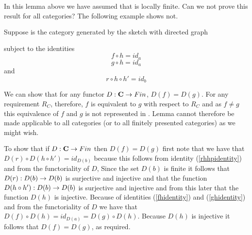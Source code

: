 In this lemma above we have assumed that \catcw is locally finite. Can we not prove this result for all categories? The following example shows not. 
\begin{example}
Suppose \catcw is the category generated by the sketch with directed graph

subject to the identities
\begin{equation}
\label{fhidentity}
f \circ h = id_a
\end{equation}
\begin{equation}
\label{ghidentity}
g \circ h = id_a
\end{equation}
and 
\begin{equation}
\label{rhhpidentity}
r \circ h \circ h' = id_b
\end{equation}

We can show that for any functor $D:\textbf{C} \rightarrow Fin$, $D(f)=D(g)$. For any requirement 
$R_C$, therefore, $f$ is equivalent to $g$ with respect to $R_C$ and as $f \neq g$ this equivalence of $f$ and $g$ 
is not represented in \catc. Lemma  cannot therefore be made applicable to all categories (or to all finitely presented categories) as we might wish.

To show that if $D:\textbf{C} \rightarrow Fin$ then $D(f)=D(g)$ 
first note that we have that $D(r) \circ D(h \circ h')=id_{D(b)}$ because this follows from
identity (\ref {rhhpidentity}) and from the functoriality of $D$, Since 
the set $D(b)$ is finite it follows that $D(r): D(b) \rightarrow D(b)$ is surjective and injective 
and that the function $D(h \circ h'):D(b) \rightarrow D(b)$ is surjective and injective and from this later
that the function $D(h)$ is injective.
Because of identities (\ref{fhidentity}) and (\ref{ghidentity}) and from the 
functoriality of $D$ we have that $D(f) \circ D(h) =id_{D(a)}=D(g) \circ D(h)$. Because $D(h)$ is injective it follows 
that $D(f)=D(g)$, as required.
\end{example}

